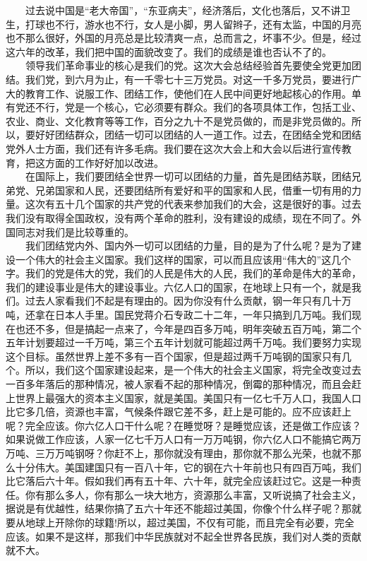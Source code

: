 \documentclass[cn,11pt,chinese]{elegantbook}
\begin{document}
　　过去说中国是“老大帝国”，“东亚病夫”，经济落后，文化也落后，又不讲卫生，打球也不行，游水也不行，女人是小脚，男人留辫子，还有太监，中国的月亮也不那么很好，外国的月亮总是比较清爽一点，总而言之，坏事不少。但是，经过这六年的改革，我们把中国的面貌改变了。我们的成绩是谁也否认不了的。\\
　　领导我们革命事业的核心是我们的党。这次大会总结经验首先要使全党更加团结。我们党，到六月为止，有一千零七十三万党员。对这一千多万党员，要进行广大的教育工作、说服工作、团结工作，使他们在人民中间更好地起核心的作用。单有党还不行，党是一个核心，它必须要有群众。我们的各项具体工作，包括工业、农业、商业、文化教育等等工作，百分之九十不是党员做的，而是非党员做的。所以，要好好团结群众，团结一切可以团结的人一道工作。过去，在团结全党和团结党外人士方面，我们还有许多毛病。我们要在这次大会上和大会以后进行宣传教育，把这方面的工作好好加以改进。\\
　　在国际上，我们要团结全世界一切可以团结的力量，首先是团结苏联，团结兄弟党、兄弟国家和人民，还要团结所有爱好和平的国家和人民，借重一切有用的力量。这次有五十几个国家的共产党的代表来参加我们的大会，这是很好的事。过去我们没有取得全国政权，没有两个革命的胜利，没有建设的成绩，现在不同了。外国同志对我们是比较尊重的。\\
　　我们团结党内外、国内外一切可以团结的力量，目的是为了什么呢？是为了建设一个伟大的社会主义国家。我们这样的国家，可以而且应该用“伟大的”这几个字。我们的党是伟大的党，我们的人民是伟大的人民，我们的革命是伟大的革命，我们的建设事业是伟大的建设事业。六亿人口的国家，在地球上只有一个，就是我们。过去人家看我们不起是有理由的。因为你没有什么贡献，钢一年只有几十万吨，还拿在日本人手里。国民党蒋介石专政二十二年，一年只搞到几万吨。我们现在也还不多，但是搞起一点来了，今年是四百多万吨，明年突破五百万吨，第二个五年计划要超过一千万吨，第三个五年计划就可能超过两千万吨。我们要努力实现这个目标。虽然世界上差不多有一百个国家，但是超过两千万吨钢的国家只有几个。所以，我们这个国家建设起来，是一个伟大的社会主义国家，将完全改变过去一百多年落后的那种情况，被人家看不起的那种情况，倒霉的那种情况，而且会赶上世界上最强大的资本主义国家，就是美国。美国只有一亿七千万人口，我国人口比它多几倍，资源也丰富，气候条件跟它差不多，赶上是可能的。应不应该赶上呢？完全应该。你六亿人口干什么呢？在睡觉呀？是睡觉应该，还是做工作应该？如果说做工作应该，人家一亿七千万人口有一万万吨钢，你六亿人口不能搞它两万万吨、三万万吨钢呀？你赶不上，那你就没有理由，那你就不那么光荣，也就不那么十分伟大。美国建国只有一百八十年，它的钢在六十年前也只有四百万吨，我们比它落后六十年。假如我们再有五十年、六十年，就完全应该赶过它。这是一种责任。你有那么多人，你有那么一块大地方，资源那么丰富，又听说搞了社会主义，据说是有优越性，结果你搞了五六十年还不能超过美国，你像个什么样子呢？那就要从地球上开除你的球籍!所以，超过美国，不仅有可能，而且完全有必要，完全应该。如果不是这样，那我们中华民族就对不起全世界各民族，我们对人类的贡献就不大。\\
\end{document}
